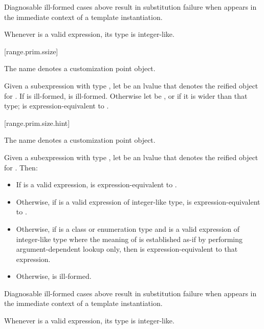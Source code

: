 \pnum
\begin{note}
Diagnosable ill-formed cases above
result in substitution failure when 
appears in the immediate context of a template instantiation.
\end{note}

\pnum
\begin{note}
Whenever  is a valid expression, its
type is integer-like.
\end{note}

[range.prim.ssize]{}
%

\pnum
The name  denotes
a customization point object.

\pnum
Given a subexpression  with type ,
let  be an lvalue that denotes the reified object for .
If  is ill-formed,
 is ill-formed.
Otherwise let  be
, or
 if it is wider than that type;
 is expression-equivalent to
.

[range.prim.size.hint]{}
%

\pnum
The name  denotes
a customization point object.

\pnum
Given a subexpression  with type ,
let  be an lvalue that denotes the reified object for .
Then:
\begin{itemize}
\item
If  is a valid expression,
 is expression-equivalent to
.
\item
Otherwise,
if  is a valid expression of
integer-like type,
 is expression-equivalent to
.
\item
Otherwise,
if  is a class or enumeration type and
 is a valid expression of
integer-like type where
the meaning of  is established as-if by
performing argument-dependent lookup only, then
 is expression-equivalent to that expression.
\item
Otherwise,
 is ill-formed.
\end{itemize}
\begin{note}
Diagnosable ill-formed cases above result in substitution failure when
 appears in the immediate context of
a template instantiation.
\end{note}
\begin{note}
Whenever  is a valid expression,
its type is integer-like.
\end{note}

